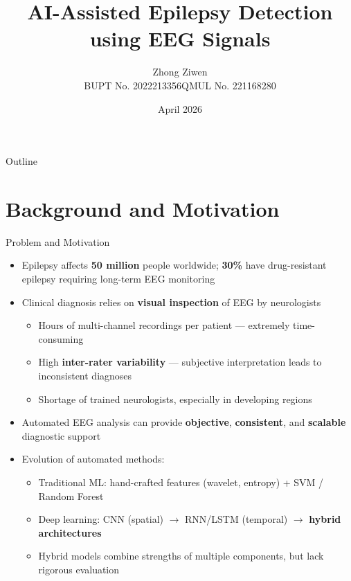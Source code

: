 \documentclass[aspectratio=169,12pt]{beamer}
\title[AI-Assisted Epilepsy Detection]{AI-Assisted Epilepsy Detection\\using EEG Signals}
\author[Zhong Ziwen]{Zhong Ziwen\\{\small BUPT No. 2022213356\quad QMUL No. 221168280}}
\institute[BUPT-QMUL]{Internet of Things Engineering\\BUPT-QMUL Joint Programme}
\date{April 2026}
\begin{document}
\begin{frame}
\titlepage
\end{frame}

\begin{frame}{Outline}
\tableofcontents[hideallsubsections]
\end{frame}

\section{Background and Motivation}

\begin{frame}{Problem and Motivation}
\begin{itemize}\itemsep4pt
    \item Epilepsy affects \textbf{50 million} people worldwide; \textbf{30\%} have drug-resistant epilepsy requiring long-term EEG monitoring
    \item Clinical diagnosis relies on \textbf{visual inspection} of EEG by neurologists
    \begin{itemize}\itemsep2pt\small
        \item Hours of multi-channel recordings per patient --- extremely time-consuming
        \item High \textbf{inter-rater variability} --- subjective interpretation leads to inconsistent diagnoses
        \item Shortage of trained neurologists, especially in developing regions
    \end{itemize}
    \item Automated EEG analysis can provide \textbf{objective}, \textbf{consistent}, and \textbf{scalable} diagnostic support
    \item Evolution of automated methods:
    \begin{itemize}\small
        \item Traditional ML: hand-crafted features (wavelet, entropy) + SVM / Random Forest
        \item Deep learning: CNN (spatial) $\rightarrow$ RNN/LSTM (temporal) $\rightarrow$ \textbf{hybrid architectures}
        \item Hybrid models combine strengths of multiple components, but lack rigorous evaluation
    \end{itemize}
\end{itemize}
\end{frame}
\end{document}

